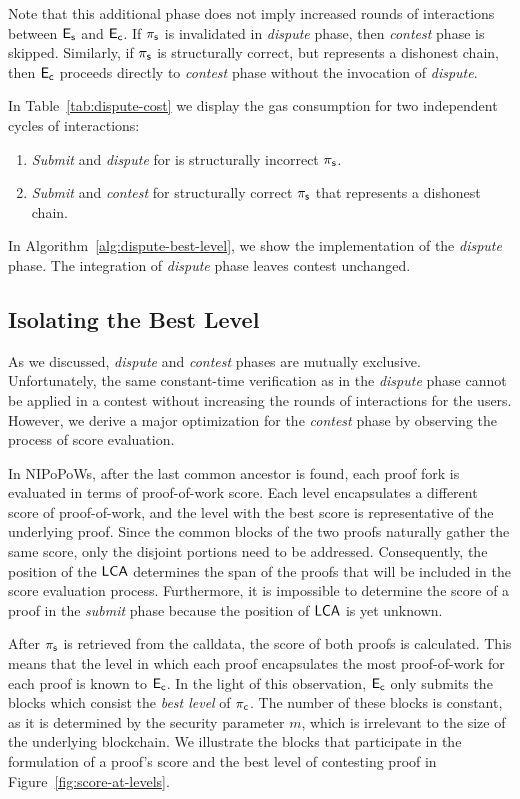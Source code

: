 Note that this additional phase does not imply increased rounds of
interactions between $\mathsf{E_{s}}$ and $\mathsf{E_{c}}$. If $\mathsf{\pi_{s}}$ is invalidated in
\emph{dispute} phase, then \emph{contest} phase is skipped. Similarly, if
$\mathsf{\pi_{s}}$ is structurally correct, but represents a dishonest chain, then $\mathsf{E_{c}}$
proceeds directly to \emph{contest} phase without the invocation of \emph{dispute}.



In Table~\ref{tab:dispute-cost} we display the gas consumption for
two independent cycles of interactions:
\begin{enumerate}
    \item \emph{Submit} and \emph{dispute} for is structurally incorrect
        $\mathsf{\pi_{s}}$.
    \item \emph{Submit} and \emph{contest} for structurally correct
        $\mathsf{\pi_{s}}$ that represents a dishonest chain.
\end{enumerate}

\noindent In Algorithm~\ref{alg:dispute-best-level}, we show the implementation
of the \emph{dispute} phase. The integration of \emph{dispute} phase leaves
\textsf{contest} unchanged.

\subsection{Isolating the Best Level} As we discussed, \emph{dispute}
and \emph{contest} phases are mutually exclusive. Unfortunately, the same
constant-time verification as in the \emph{dispute} phase cannot be applied in a
contest without increasing the rounds of interactions for the users. However,
we derive a major optimization for the \emph{contest} phase by observing the
process of score evaluation.

In NIPoPoWs, after the last common ancestor is found, each proof fork
is evaluated in terms of proof-of-work score. Each level encapsulates a different
score of proof-of-work, and the level with the best score is representative
of the underlying proof. Since the common blocks of the two proofs naturally
gather the same score, only the disjoint portions need to be addressed.
Consequently, the position of the $\mathsf{LCA}$ determines the span of the proofs that
will be included in the score evaluation process. Furthermore, it is impossible
to determine the score of a proof in the \emph{submit} phase because the position
of $\mathsf{LCA}$ is yet unknown.

After $\mathsf{\pi_{s}}$ is retrieved from the calldata, the score of both proofs is
calculated. This means that the level in which each proof encapsulates the
most proof-of-work for each proof is known to $\mathsf{E_{c}}$. In the light of this
observation, $\mathsf{E_{c}}$ only submits the blocks which consist the \emph{best level}
of $\mathsf{\pi_{c}}$. The number of these blocks is constant, as it is determined by the
security parameter $m$, which is irrelevant to the size of the underlying
blockchain. We illustrate the blocks that participate in the formulation of a
proof's score and the best level of contesting proof in
Figure~\ref{fig:score-at-levels}.

